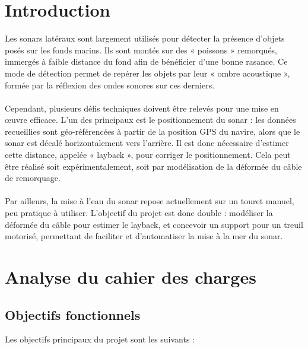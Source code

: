 \documentclass[12pt,a4paper]{report}
\begin{document}
\chapter{Introduction}

Les sonars latéraux sont largement utilisés pour détecter la présence d’objets posés sur les fonds marins.
Ils sont montés sur des « poissons » remorqués, immergés à faible distance du fond afin de bénéficier d’une bonne rasance.
Ce mode de détection permet de repérer les objets par leur « ombre acoustique », formée par la réflexion des ondes sonores sur ces derniers.
\\ \\

Cependant, plusieurs défis techniques doivent être relevés pour une mise en œuvre efficace.
L’un des principaux est le positionnement du sonar : les données recueillies sont géo-référencées à partir de la
position GPS du navire, alors que le sonar est décalé horizontalement vers l’arrière. Il est donc nécessaire d’estimer
cette distance, appelée « layback », pour corriger le positionnement. Cela peut être réalisé soit expérimentalement,
soit par modélisation de la déformée du câble de remorquage.
\\ \\

Par ailleurs, la mise à l’eau du sonar repose actuellement sur un touret manuel, peu pratique à utiliser.
L’objectif du projet est donc double : modéliser la déformée du câble pour estimer le layback,
et concevoir un support pour un treuil motorisé, permettant de faciliter et d’automatiser la mise à la mer du
sonar.


\chapter{Analyse du cahier des charges}

\section{Objectifs fonctionnels}

Les objectifs principaux du projet sont les suivants :
\end{document}
